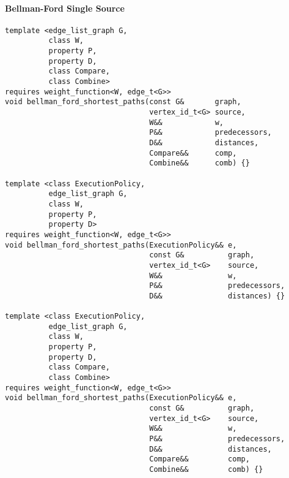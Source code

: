 \paragraph{Bellman-Ford Single Source}
\begin{lstlisting}
template <edge_list_graph G,
          class W,
          property P,
          property D,
          class Compare,
          class Combine>
requires weight_function<W, edge_t<G>>
void bellman_ford_shortest_paths(const G&       graph,
                                 vertex_id_t<G> source,
                                 W&&            w,
                                 P&&            predecessors,
                                 D&&            distances,
                                 Compare&&      comp,
                                 Combine&&      comb) {}

template <class ExecutionPolicy,
          edge_list_graph G,
          class W,
          property P,
          property D>
requires weight_function<W, edge_t<G>>
void bellman_ford_shortest_paths(ExecutionPolicy&& e,
                                 const G&          graph,
                                 vertex_id_t<G>    source,
                                 W&&               w,
                                 P&&               predecessors,
                                 D&&               distances) {}

template <class ExecutionPolicy,
          edge_list_graph G,
          class W,
          property P,
          property D,
          class Compare,
          class Combine>
requires weight_function<W, edge_t<G>>
void bellman_ford_shortest_paths(ExecutionPolicy&& e,
                                 const G&          graph,
                                 vertex_id_t<G>    source,
                                 W&&               w,
                                 P&&               predecessors,
                                 D&&               distances,
                                 Compare&&         comp,
                                 Combine&&         comb) {}

\end{lstlisting}


